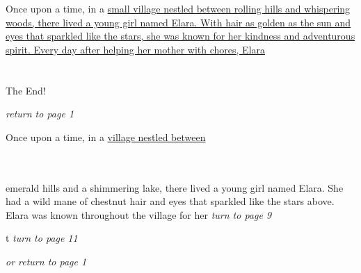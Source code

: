 \documentclass{memoir}
\begin{document}
        


        \hspace{1cm}\vfill
        \begin{minipage}{3in}
        \LARGE
        Once upon a time, in a \ul{small village nestled between rolling hills and whispering woods, there lived a young girl named Elara. With hair as golden as the sun and eyes that sparkled like the stars, she was known for her kindness and adventurous spirit. Every day after helping her mother with chores, Elara}\\ \vspace{5mm} \\
 \\\vspace{1cm} The End! \\ 

        \hspace{1cm}\begin{minipage}{6cm}
        \normalsize
            \hfill \textit{return to page 1}
        \end{minipage} 
        \end{minipage}
        \hspace{1cm}\vfill
        \cleardoublepage

        


        \hspace{1cm}\vfill
        \begin{minipage}{3in}
        \LARGE
        Once upon a time, in a \ul{village nestled between}\\ \vspace{5mm} \\
  \\ 

        \hspace{1cm}\begin{minipage}{6cm}
        \normalsize
            emerald hills and a shimmering lake, there lived a young girl named Elara. She had a wild mane of chestnut hair and eyes that sparkled like the stars above. Elara was known throughout the village for her  \hfill \textit{turn to page 9}\\ \vspace{5mm}

t \hfill \textit{turn to page 11}\\ \vspace{5mm}

\hfill \textit{or return to page 1}
        \end{minipage} 
        \end{minipage}
        \hspace{1cm}\vfill
        \cleardoublepage
\end{document}

